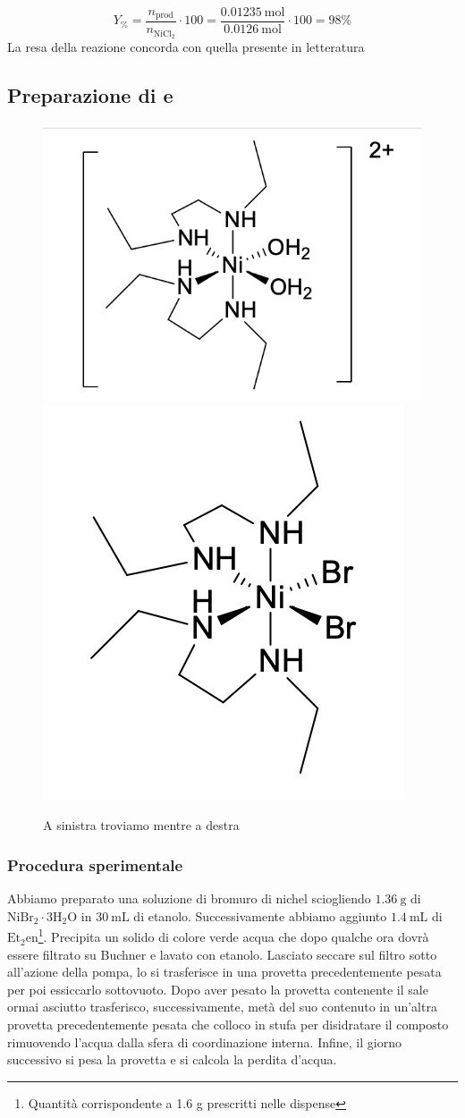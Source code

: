 $$Y_\% = \frac{n_\text{prod}}{n_{\mathrm{NiCl}_2}}\cdot 100 = \frac{0.01235 \mathrm{~mol}}{0.0126 \mathrm{~mol}} \cdot 100 =98 \%
$$
La resa della reazione concorda con quella presente in letteratura \cite{support}
\subsection{Preparazione di  e \ce{[Ni(Et2en)2Br2]}}
\begin{figure}[ht!]
    \centering
    \includegraphics[width=0.4\linewidth]{foto/nieten2.png}
    \includegraphics[width=0.265\linewidth]{foto/nietenbr2.png}
    \caption{A sinistra troviamo  mentre a destra \ce{[Ni(Et2en)2Br2]} }
    \label{fig:nieten}
\end{figure}



\subsubsection{Procedura sperimentale}

Abbiamo preparato una soluzione di bromuro di nichel sciogliendo $1.36 \mathrm{~g}$ di $\mathrm{NiBr}_2 \cdot 3 \mathrm{H}_2 \mathrm{O}$ in $30 \mathrm{~mL}$ di etanolo. Successivamente abbiamo aggiunto  $1.4 \mathrm{~mL}$ di $\mathrm{Et}_2 \mathrm{en}$\footnote{ Quantità corrispondente a 1.6 g prescritti nelle dispense}. Precipita un solido di colore verde acqua che dopo qualche ora dovrà essere filtrato su Buchner e lavato con etanolo. Lasciato seccare sul filtro sotto all'azione della pompa, lo si trasferisce in una provetta precedentemente pesata per poi essiccarlo sottovuoto. Dopo aver pesato la provetta contenente il sale ormai asciutto trasferisco, successivamente, metà del suo contenuto in un'altra provetta precedentemente pesata che colloco in stufa per disidratare il composto rimuovendo l'acqua dalla sfera di coordinazione interna. Infine, il giorno successivo si pesa la provetta e si calcola la perdita d'acqua.

